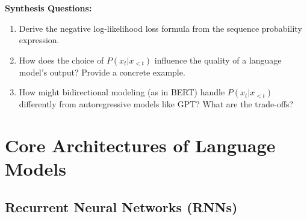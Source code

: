 \begin{questionbox}
\textbf{Synthesis Questions:}
\begin{enumerate}
    \item Derive the negative log-likelihood loss formula from the sequence probability expression.
    \item How does the choice of \( P(x_t | x_{<t}) \) influence the quality of a language model's output? Provide a concrete example.
    \item How might bidirectional modeling (as in BERT) handle \( P(x_t | x_{<t}) \) differently from autoregressive models like GPT? What are the trade-offs? 
\end{enumerate}
\end{questionbox}


\section{Core Architectures of Language Models}

\subsection{Recurrent Neural Networks (RNNs)}

